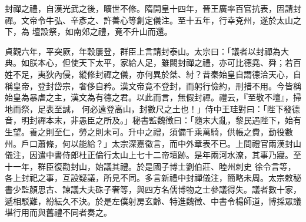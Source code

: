 
\begin{pinyinscope}

 封禪之禮，自漢光武之後，曠世不修。隋開皇十四年，晉王廣率百官抗表，固請封禪。文帝令牛弘、辛彥之、許善心等創定儀注。至十五年，行幸兗州，遂於太山之下，為
 壇設祭，如南郊之禮，竟不升山而還。



 貞觀六年，平突厥，年穀屢登，群臣上言請封泰山。太宗曰：「議者以封禪為大典。如朕本心，但使天下太平，家給人足，雖闕封禪之禮，亦可比德堯、舜；若百姓不足，夷狄內侵，縱修封禪之儀，亦何異於桀、紂？昔秦始皇自謂德洽天心，自稱皇帝，登封岱宗，奢侈自矜。漢文帝竟不登封，而躬行儉約，刑措不用。今皆稱始皇為暴虐之主，漢文為有德之君。以此而言，無假封禪。禮云，『至敬不壇』，掃地而祭，足表至誠，
 何必遠登高山，封數尺之土也！」侍中王珪對曰：「陛下發德音，明封禪本末，非愚臣之所及。」秘書監魏徵曰：「隨末大亂，黎民遇陛下，始有生望。養之則至仁，勞之則未可。升中之禮，須備千乘萬騎，供帳之費，動役數州。戶口蕭條，何以能給？」太宗深嘉徵言，而中外章表不已。上問禮官兩漢封山儀注，因遣中書侍郎杜正倫行太山上七十二帝壇跡。是年兩河水潦，其事乃寢。至十一年，群臣復勸封山，始議其禮。於是國子博士劉伯莊、睦州刺史
 徐令言等，各上封祀之事，互設疑議，所見不同。多言新禮中封禪儀注，簡略未周。太宗敕秘書少監顏思古、諫議大夫硃子奢等，與四方名儒博物之士參議得失。議者數十家，遞相駁難，紛紜久不決。於是左僕射房玄齡、特進魏徵、中書令楊師道，博採眾議堪行用而與舊禮不同者奏之。




\end{pinyinscope}

